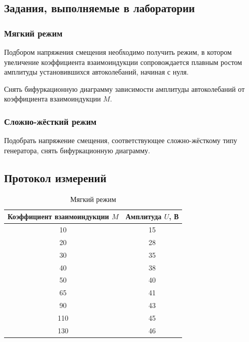 \subsection{Задания, выполняемые в лаборатории}

\subsubsection{Мягкий режим}

Подбором напряжения смещения необходимо получить режим, в котором увеличение коэффициента взаимоиндукции сопровождается плавным ростом амплитуды установившихся автоколебаний, начиная с нуля.

Снять бифуркационную диаграмму зависимости амплитуды автоколебаний от коэффициента взаимоиндукции $M$.

\subsubsection{Сложно-жёсткий режим}

Подобрать напряжение смещения, соответствующее сложно-жёсткому типу генератора, снять бифуркационную диаграмму.

\subsection{Протокол измерений}

\begin{table}[H]
	\centering
	\caption{Мягкий режим}
	\label{tab:pr:1}
	\begin{tabular}{cc}
		\toprule
		Коэффициент взаимоиндукции $M$ & Амплитуда $U$, В \\
		\midrule
		10 & 15 \\
		20 & 28 \\
		30 & 35 \\
		40 & 38 \\
		50 & 40 \\
		65 & 41 \\
		90 & 43 \\
		110 & 45 \\
		130 & 46 \\
		\bottomrule
	\end{tabular}
\end{table}

